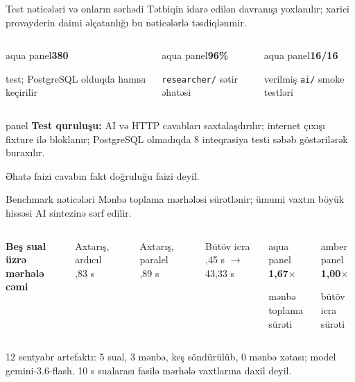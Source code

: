 \documentclass[aspectratio=169,11pt]{beamer}
\newenvironment{panel}{\begin{beamercolorbox}[wd=\linewidth,sep=1.2ex,rounded=true]{panel}}{\end{beamercolorbox}}
\newenvironment{aquapanel}{\begin{beamercolorbox}[wd=\linewidth,sep=1.2ex,rounded=true]{aqua panel}}{\end{beamercolorbox}}
\newenvironment{amberpanel}{\begin{beamercolorbox}[wd=\linewidth,sep=1.2ex,rounded=true]{amber panel}}{\end{beamercolorbox}}
\newcommand{\lead}[1]{{\color{muted}\normalsize #1}\par\vspace{0.75em}}
\newcommand{\tinyref}[1]{{\color{muted}\scriptsize #1}}
\newcommand{\metric}[2]{{\color{teal}\Large\bfseries #1}\par{\small #2}}
\begin{document}
\begin{frame}{Test nəticələri və onların sərhədi}
  \lead{Tətbiqin idarə edilən davranışı yoxlanılır; xarici provayderin daimi əlçatanlığı bu nəticələrlə təsdiqlənmir.}
  \begin{columns}[T,onlytextwidth]
      \begin{aquapanel}\metric{380}{test; PostgreSQL olduqda hamısı keçirilir}\end{aquapanel}
      \begin{aquapanel}\metric{96\%}{\texttt{researcher/} sətir əhatəsi}\end{aquapanel}
      \begin{aquapanel}\metric{16/16}{verilmiş \texttt{ai/} smoke testləri}\end{aquapanel}
  \end{columns}
  \vspace{5mm}
  \begin{panel}
    \small \textbf{Test quruluşu:} AI və HTTP cavabları saxtalaşdırılır; internet çıxışı fixture ilə bloklanır; PostgreSQL olmadıqda 8 inteqrasiya testi səbəb göstərilərək buraxılır.
  \end{panel}
  \vspace{2mm}
  \tinyref{Əhatə faizi cavabın fakt doğruluğu faizi deyil.}
\end{frame}

\begin{frame}{Benchmark nəticələri}
  \lead{Mənbə toplama mərhələsi sürətlənir; ümumi vaxtın böyük hissəsi AI sintezinə sərf edilir.}
  \begin{columns}[T,onlytextwidth]
      \textbf{Beş sual üzrə mərhələ cəmi}\par\vspace{3mm}
      \small Axtarış, ardıcıl ,83 s\par
      {\color{orange}\rule{49mm}{4mm}}\par\vspace{2mm}
      \small Axtarış, paralel ,89 s\par
      {\color{teal}\rule{29mm}{4mm}}\par\vspace{3mm}
      \small Bütöv icra ,45 s $\rightarrow$ 43,33 s
      \begin{aquapanel}
        \metric{1,67$\times$}{mənbə toplama sürəti}
      \end{aquapanel}
      \vspace{2mm}
      \begin{amberpanel}
        \metric{1,00$\times$}{bütöv icra sürəti}
      \end{amberpanel}
  \end{columns}
  \vspace{3mm}
  \tinyref{12 sentyabr artefaktı: 5 sual, 3 mənbə, keş söndürülüb, 0 mənbə xətası; model gemini-3.6-flash. 10 s sualarası fasilə mərhələ vaxtlarına daxil deyil.}
\end{frame}
\end{document}
